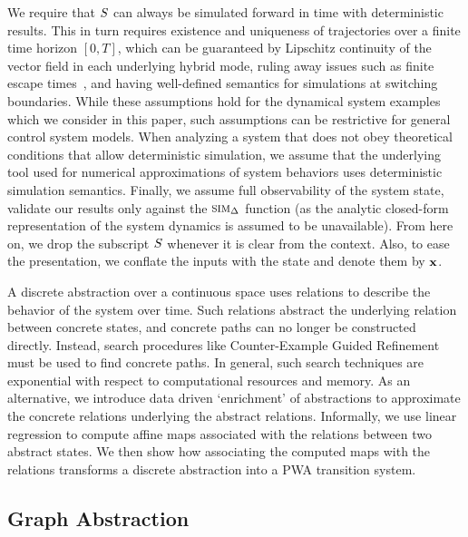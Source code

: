  We require that $S$ can always be
simulated forward in time with deterministic results. This in turn
requires existence and uniqueness of trajectories over a finite time
horizon $[0,T]$, which can be guaranteed by Lipschitz continuity of
the vector field in each underlying hybrid mode, ruling away issues
such as finite escape times~\cite{Meiss/2007/Differential}, and having
well-defined semantics for simulations at switching boundaries. While
these assumptions hold for the dynamical system examples which we
consider in this paper, such assumptions can be restrictive for
general control system models. When analyzing a system that does not
obey theoretical conditions that allow deterministic simulation, we
assume that the underlying tool used for numerical approximations of
system behaviors uses deterministic simulation semantics.  Finally, we
assume full observability of the system state, validate our results
only against the $\mbox{\sc sim}_\Delta$ function (as the analytic closed-form
representation of the system dynamics is assumed to be unavailable).
From here on, we drop the subscript $S$ whenever it is clear
from the context. Also, to ease the presentation, we conflate the
inputs with the state and denote them by $\mathbf{x}$.


A discrete abstraction over a continuous space uses relations to
describe the behavior of the system over time. Such relations abstract
the underlying relation between concrete states, and concrete paths
can no longer be constructed directly. Instead, search procedures
like Counter-Example Guided Refinement must be used to find concrete
paths. In general, such search techniques are exponential with respect to
computational resources and memory. As an alternative, we introduce
data driven `enrichment' of abstractions to approximate the concrete
relations underlying the abstract relations. Informally, we use linear
regression to compute affine maps associated with the relations
between two abstract states. We then show how associating the computed
maps with the relations transforms a discrete abstraction into a PWA
transition system.

\subsection{Graph Abstraction}

